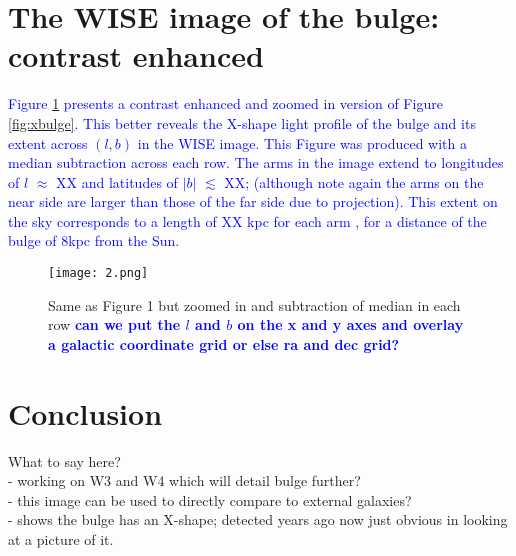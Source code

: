 \documentclass[12pt, preprint]{aastex}
\begin{document}
\section{The WISE image of the bulge: contrast enhanced}

\textcolor{blue}{Figure \ref{fig:filt} presents a contrast enhanced and zoomed in version of Figure \ref{fig:xbulge}. This better reveals the X-shape light profile of the bulge and its extent across $(l,b)$ in the WISE image. This Figure was produced with a median subtraction across each row. The arms in the image extend to longitudes of $l$ $\approx$ XX and latitudes of $|b|$ $\lesssim$ XX; (although note again the arms on the near side are larger than those of the far side due to projection). This extent on the sky corresponds to a length of XX kpc for each arm  , for a distance of the bulge of 8kpc from the Sun. }

\begin{figure}[h!]
\centering
        \texttt{[image: 2.png]}
\caption{Same as Figure 1 but zoomed in and subtraction of median in each row \textcolor{blue}{\bf{can we put the $l$ and $b$ on the x and y axes and overlay a galactic coordinate grid or else ra and dec grid?}}}
\label{fig:filt}
\end{figure}



\section{Conclusion}

What to say here?\\
- working on W3 and W4 which will detail bulge further?\\
- this image can be used to directly compare to external galaxies? \\
- shows the bulge has an X-shape; detected years ago now just obvious in looking at a picture of it. \\




\end{document}
